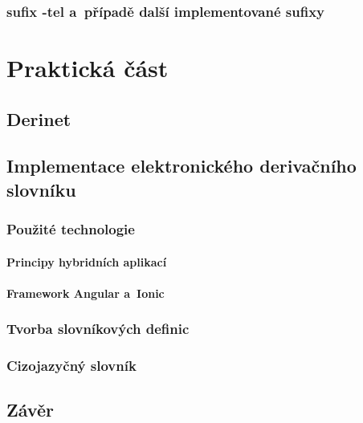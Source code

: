 \hypertarget{sufix--tel-a-pux159uxedpadux11b-dalux161uxed-implementovanuxe9-sufixy}{%
\section{sufix -tel a~případě další implementované
sufixy}\label{sufix--tel-a-pux159uxedpadux11b-dalux161uxed-implementovanuxe9-sufixy}}

\part{Praktická část}

\hypertarget{derinet}{%
\chapter{Derinet}\label{derinet}}

\hypertarget{implementace-elektronickuxe9ho-derivaux10dnuxedho-slovnuxedku}{%
\chapter{Implementace elektronického derivačního
slovníku}\label{implementace-elektronickuxe9ho-derivaux10dnuxedho-slovnuxedku}}

\hypertarget{pouux17eituxe9-technologie}{%
\section{Použité technologie}\label{pouux17eituxe9-technologie}}

\hypertarget{principy-hybridnuxedch-aplikacuxed}{%
\subsection{Principy hybridních
aplikací}\label{principy-hybridnuxedch-aplikacuxed}}

\hypertarget{framework-angular-a-ionic}{%
\subsection{Framework Angular
a~Ionic}\label{framework-angular-a-ionic}}

\hypertarget{tvorba-slovnuxedkovuxfdch-definic}{%
\section{Tvorba slovníkových
definic}\label{tvorba-slovnuxedkovuxfdch-definic}}

\hypertarget{cizojazyux10dnuxfd-slovnuxedk}{%
\section{Cizojazyčný slovník}\label{cizojazyux10dnuxfd-slovnuxedk}}

\hypertarget{zuxe1vux11br}{%
\chapter*{Závěr}\label{zaver}
}
